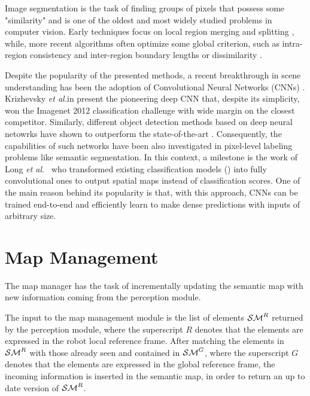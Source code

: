 \documentclass[letterpaper, 10 pt, conference]{ieeeconf}  %
\newcommand\etal{\emph{et al.}}
\begin{document}
Image segmentation is the task of finding groups of pixels that possess some "similarity" and is one of the oldest and most widely studied problems in computer vision.
Early techniques focus on local region merging and splitting \cite{ohlander1978picture,brice1970scene}, while, more recent algorithms often optimize some global criterion, such as intra-region consistency and inter-region boundary lengths or dissimilarity \cite{comaniciu2002pami,shi2000pami,felzenszwalb2004ijcv,chan2001ip,osher1988jcp}. 

Despite the popularity of the presented methods, a recent breakthrough in scene understanding has been the adoption of Convolutional Neural Networks (CNNs) \cite{garcia2017review}. Krizhevsky \etal in \cite{krizhevsky2012nipsjournal} present the pioneering deep CNN that, despite its simplicity, won the Imagenet 2012 classification challenge with wide margin on the closest competitor. Similarly, different object detection methods based on deep neural netowrks have shown to outperform the state-of-the-art \cite{redmon2016cvpr,erhan2014cvpr,liu2016eccv}. Consequently, the capabilities of such networks have been also investigated in pixel-level labeling problems like semantic segmentation. In this context, a milestone is the work of Long \etal~\cite{long2015cvpr} who transformed existing classification models (\cite{simonyan2014very,szegedy2015cvpr}) into fully convolutional ones to output spatial maps instead of classification scores. One of the main reason behind its popularity is that, with this approach, CNNs can be trained end-to-end and efficiently learn to make dense predictions with inputs of arbitrary size.
	
\section{Map Management}
\label{sec:mapman}

The map manager has the task of incrementally updating the semantic map with new information coming from the perception module. 

The input to the map management module is the list of elements $\mathcal{SM}^R$ returned by the perception module, where the superscript $R$ denotes that the elements are expressed in the robot local reference frame. After matching the elements in $\mathcal{SM}^R$ with those already seen and contained in $\mathcal{SM}^G$, where the superscript $G$ denotes that the elements are expressed in the global reference frame, the incoming information is inserted in the semantic map, in order to return an up to date version of $\mathcal{SM}^R$.
\end{document}

